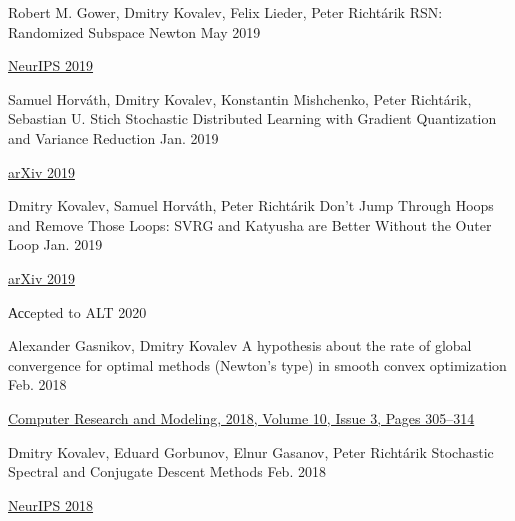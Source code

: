 \begin{cventries}
\cventry
{Robert M. Gower, Dmitry Kovalev, Felix Lieder, Peter Richtárik} %
{RSN: Randomized Subspace Newton} %
{} %
{May 2019} %
{ %
	\begin{cvitems}
		\item {\href{https://papers.nips.cc/paper/8351-rsn-randomized-subspace-newton}{NeurIPS 2019}}
	\end{cvitems}
}

\cventry
{Samuel Horváth, Dmitry Kovalev, Konstantin Mishchenko, Peter Richtárik, Sebastian U. Stich} %
{Stochastic Distributed Learning with Gradient Quantization and Variance Reduction} %
{} %
{Jan. 2019} %
{ %
	\begin{cvitems}
		\item {\href{https://arxiv.org/abs/1904.05115}{arXiv 2019}}
	\end{cvitems}
}

\cventry
{Dmitry Kovalev, Samuel Horváth, Peter Richtárik} %
{Don't Jump Through Hoops and Remove Those Loops: SVRG and Katyusha are Better Without the Outer Loop} %
{} %
{Jan. 2019} %
{ %
	\begin{cvitems}
		\item {\href{https://arxiv.org/abs/1901.08689}{arXiv 2019}}
		\item Ассepted to ALT 2020
	\end{cvitems}
}


\cventry
{Alexander Gasnikov, Dmitry Kovalev	} %
{A hypothesis about the rate of global convergence for optimal methods (Newton's type) in smooth convex optimization } %
{} %
{Feb. 2018} %
{ %
	\begin{cvitems}
		\item {\href{http://www.mathnet.ru/php/archive.phtml?wshow=paper\&jrnid=crm\&paperid=253\&option\_lang=eng}{
				Computer Research and Modeling, 2018,	Volume 10,	Issue 3,	Pages 305–314}}
	\end{cvitems}
}


\cventry
{Dmitry Kovalev, Eduard Gorbunov, Elnur Gasanov, Peter Richtárik} %
{Stochastic Spectral and Conjugate Descent Methods} %
{} %
{Feb. 2018} %
{ %
\begin{cvitems}
\item {\href{https://papers.nips.cc/paper/7596-stochastic-spectral-and-conjugate-descent-methods}{NeurIPS 2018}}
\end{cvitems}
}



\end{cventries}